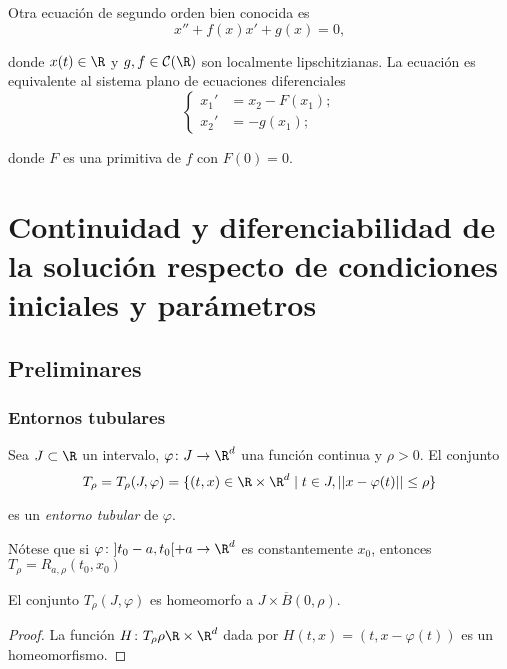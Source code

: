 \documentclass{article}
\begin{document}
\begin{ex}
  Otra ecuación de segundo orden bien conocida es
  \begin{equation}
    \label{eq:lienard}
    x'' + f(x)x' + g(x) = 0,
  \end{equation}

  donde $x(t) \in \R$ y $g,f \in \mathcal{C}(\R)$ son localmente lipschitzianas. La ecuación es
  equivalente al sistema plano de ecuaciones diferenciales
  \begin{equation}
    \label{eq:lienard:sis}
    \begin{cases}
      x_1' & = x_2 - F(x_1); \\
      x_2' & = - g(x_1);
    \end{cases}
  \end{equation}

  donde $F$ es una primitiva de $f$ con $F(0) = 0$.
\end{ex}

\newpage
\section{Continuidad y diferenciabilidad de la solución respecto de condiciones iniciales y  parámetros}

\subsection{Preliminares}

\subsubsection{Entornos tubulares}

\begin{definition}
  Sea $J \subset \R$ un intervalo, $\varphi \colon J \to \R^d$ una función continua y $\rho > 0$. El
  conjunto
  \[ T_{\rho} = T_{\rho}(J, \varphi) = \{(t,x) \in \R \times \R^d \mid t \in J, ||x-\varphi(t)|| \le
    \rho\} \]

  es un \emph{entorno tubular} de $\varphi$.
\end{definition}

Nótese que si $\varphi \colon ]t_0-a, t_0[ +a\to \R^d$ es constantemente $x_0$, entonces
$T_{\rho} = R_{a, \rho}(t_0, x_0)$

\begin{lemma}
  El conjunto $T_\rho(J,\varphi)$ es homeomorfo a $J \times \overline{B}(0,\rho)$.
\end{lemma}
\begin{proof}
  La función $H \colon T_{\rho} \rho \R \times \R^d$ dada por $H(t,x) = (t, x-\varphi(t))$ es un
  homeomorfismo.
\end{proof}
\end{document}
